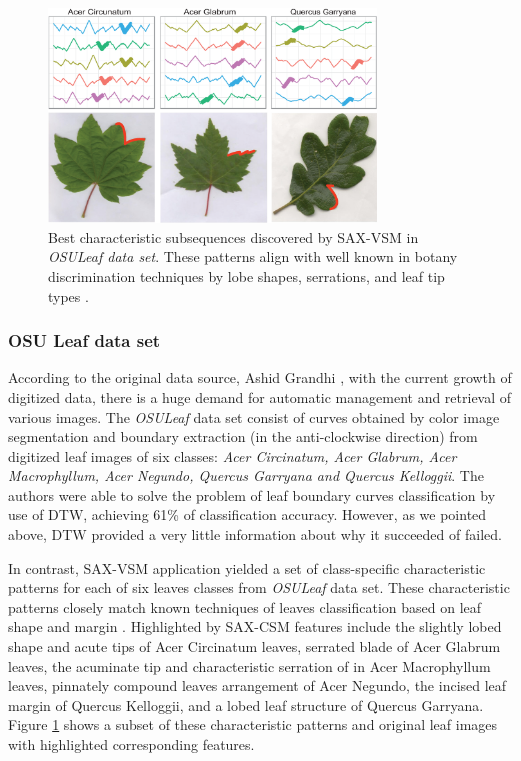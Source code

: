 \documentclass[conference]{IEEEtran}
\newcommand{\myfigureshrinker}{\vspace{0.05cm}}
\begin{document}
\begin{figure}[t]
   \myfigureshrinker
   \centering
   \includegraphics[width=87mm]{figures/AcerCircunatum.eps}
   \caption{Best characteristic subsequences discovered by SAX-VSM in \textit{OSULeaf data set}.
These patterns align with well known in botany discrimination techniques
by lobe shapes, serrations, and leaf tip types \cite{dirr}.}
   \label{fig:shapelet-acer-patterns}
\end{figure}

\subsubsection{OSU Leaf data set}
According to the original data source, Ashid Grandhi \cite{osuleaf}, with the current growth of
digitized data, there is a huge demand for automatic management and retrieval of various images. The
\textit{OSULeaf} data set consist of curves obtained by color image segmentation and boundary
extraction (in the anti-clockwise direction) from digitized leaf images of six classes: \textit{Acer
Circinatum, Acer Glabrum, Acer Macrophyllum, Acer Negundo, Quercus Garryana and Quercus Kelloggii}.
The authors were able to solve the problem of leaf boundary curves classification by use of DTW, 
achieving 61\% of classification accuracy. However, as we pointed above, DTW provided a
very little information about why it succeeded of failed. 

In contrast, SAX-VSM application yielded a set of class-specific characteristic patterns for each of
six leaves classes from \textit{OSULeaf} data set. These characteristic patterns closely match
known techniques of leaves classification based on leaf shape and margin \cite{dirr}. 
Highlighted by SAX-CSM features include the slightly lobed shape and acute tips of
Acer Circinatum leaves, serrated blade of Acer Glabrum leaves, the acuminate tip and characteristic
serration of in Acer Macrophyllum leaves, pinnately compound leaves arrangement of Acer Negundo, the
incised leaf margin of Quercus Kelloggii, and a lobed leaf structure of Quercus Garryana. 
Figure \ref{fig:shapelet-acer-patterns} shows a subset of these characteristic patterns and original
leaf images with highlighted corresponding features.
\end{document}
